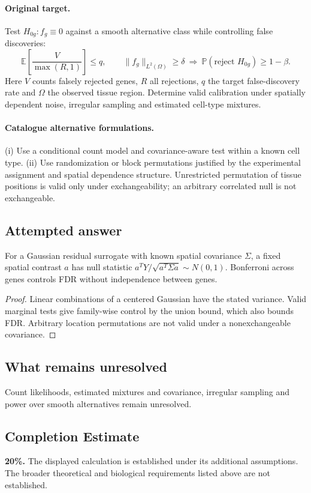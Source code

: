 \documentclass[11pt]{article}
\begin{document}
\paragraph{Original target.}
Test $H_{0g}:f_g\equiv0$ against a smooth alternative class while controlling false discoveries:
\[\mathbb{E}\!\left[\frac{V}{\max(R,1)}\right]\le q,\qquad \|f_g\|_{L^2(\Omega)}\ge\delta\ \Longrightarrow\ \mathbb{P}(\text{reject }H_{0g})\ge1-\beta.\]
Here $V$ counts falsely rejected genes, $R$ all rejections, $q$ the target false-discovery rate and $\Omega$ the observed tissue region. Determine valid calibration under spatially dependent noise, irregular sampling and estimated cell-type mixtures.
\paragraph{Catalogue alternative formulations.}
(i) Use a conditional count model and covariance-aware test within a known cell type. (ii) Use randomization or block permutations justified by the experimental assignment and spatial dependence structure. Unrestricted permutation of tissue positions is valid only under exchangeability; an arbitrary correlated null is not exchangeable.
\subsection{Attempted answer}
\begin{proposition}
For a Gaussian residual surrogate with known spatial covariance $\Sigma$, a fixed spatial contrast $a$ has null statistic $a^TY/\sqrt{a^T\Sigma a}\sim N(0,1)$. Bonferroni across genes controls FDR without independence between genes.
\end{proposition}
\begin{proof}
Linear combinations of a centered Gaussian have the stated variance. Valid marginal tests give family-wise control by the union bound, which also bounds FDR. Arbitrary location permutations are not valid under a nonexchangeable covariance.
\end{proof}
\subsection{What remains unresolved}
Count likelihoods, estimated mixtures and covariance, irregular sampling and power over smooth alternatives remain unresolved.
\subsection{Completion Estimate}
\textbf{20\%.} The displayed calculation is established under its additional assumptions. The broader theoretical and biological requirements listed above are not established.
\end{document}
